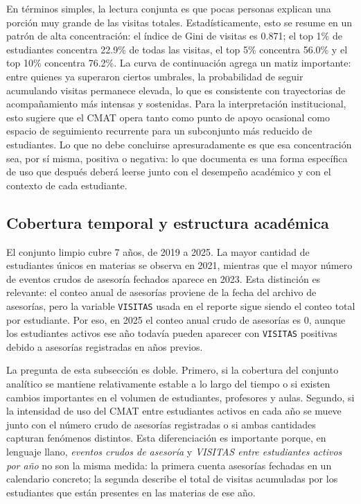 \documentclass[8pt,a4paper]{article} %
\numberwithin{figure}{subsection}
\begin{document}
En términos simples, la lectura conjunta es que pocas personas explican una porción muy grande de las visitas totales. Estadísticamente, esto se resume en un patrón de alta concentración: el índice de Gini de visitas es 0.871; el top 1\% de estudiantes concentra 22.9\% de todas las visitas, el top 5\% concentra 56.0\% y el top 10\% concentra 76.2\%. La curva de continuación agrega un matiz importante: entre quienes ya superaron ciertos umbrales, la probabilidad de seguir acumulando visitas permanece elevada, lo que es consistente con trayectorias de acompañamiento más intensas y sostenidas. Para la interpretación institucional, esto sugiere que el CMAT opera tanto como punto de apoyo ocasional como espacio de seguimiento recurrente para un subconjunto más reducido de estudiantes. Lo que no debe concluirse apresuradamente es que esa concentración sea, por sí misma, positiva o negativa: lo que documenta es una forma específica de uso que después deberá leerse junto con el desempeño académico y con el contexto de cada estudiante.

\begin{table}[!htbp]
    \centering
    \small
    \caption{Indicadores de concentración y dispersión estructural de las visitas.}
    \label{tab:data_concentration}
    \resizebox{0.72\textwidth}{!}{}
\end{table}

\subsection{Cobertura temporal y estructura académica}
El conjunto limpio cubre 7 años, de 2019 a 2025. La mayor cantidad de estudiantes únicos en materias se observa en 2021, mientras que el mayor número de eventos crudos de asesoría fechados aparece en 2023. Esta distinción es relevante: el conteo anual de asesorías proviene de la fecha del archivo de asesorías, pero la variable \texttt{VISITAS} usada en el reporte sigue siendo el conteo total por estudiante. Por eso, en 2025 el conteo anual crudo de asesorías es 0, aunque los estudiantes activos ese año todavía pueden aparecer con \texttt{VISITAS} positivas debido a asesorías registradas en años previos.

La pregunta de esta subsección es doble. Primero, si la cobertura del conjunto analítico se mantiene relativamente estable a lo largo del tiempo o si existen cambios importantes en el volumen de estudiantes, profesores y aulas. Segundo, si la intensidad de uso del CMAT entre estudiantes activos en cada año se mueve junto con el número crudo de asesorías registradas o si ambas cantidades capturan fenómenos distintos. Esta diferenciación es importante porque, en lenguaje llano, \emph{eventos crudos de asesoría} y \emph{VISITAS entre estudiantes activos por año} no son la misma medida: la primera cuenta asesorías fechadas en un calendario concreto; la segunda describe el total de visitas acumuladas por los estudiantes que están presentes en las materias de ese año.
\end{document}
